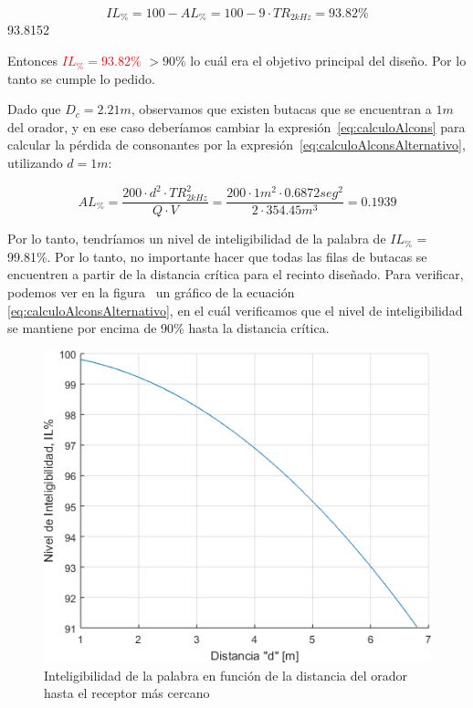 \begin{equation*}
   \boxed{ IL_{\%} = 100 - AL_{\%} = 100 - 9\cdot TR_{2kHz} =  93.82\% }
\end{equation*}
93.8152
\par Entonces \textcolor{red}{ $IL_{\%} =93.82\%$ } $> 90\% $ lo cuál era el objetivo principal del diseño. Por lo tanto se cumple lo pedido.\\

\par Dado que $D_c = 2.21m$, observamos que existen butacas que se encuentran a $1m$ del orador, y en ese caso deberíamos cambiar la expresión~\eqref{eq:calculoAlcons} para calcular la pérdida de consonantes por la expresión~\eqref{eq:calculoAlconsAlternativo}, utilizando $d=1m$:

\begin{equation*}
    \boxed{ AL_{\%} = \frac{200 \cdot d^2 \cdot TR_{2kHz}^2}{Q\cdot V} = \frac{200 \cdot 1m^2 \cdot 0.6872 seg^2}{2 \cdot 354.45m^3} = 0.1939 }
    \label{eq:calculoAlconsAlternativo}
\end{equation*}

\par Por lo tanto, tendríamos un nivel de inteligibilidad de la palabra de $IL_{\%}$ =  99.81\%. Por lo tanto, no importante hacer que todas las filas de butacas se encuentren a partir de la distancia crítica para el recinto diseñado. Para verificar, podemos ver en la figura~ un gráfico de la ecuación~ \eqref{eq:calculoAlconsAlternativo}, en el cuál verificamos que el nivel de inteligibilidad se mantiene por encima de 90\% hasta la distancia crítica.

\begin{figure}[H]
	\centering
	\includegraphics[width=1\textwidth]{./img/nivel_inteligibilidad.png}
	\caption{Inteligibilidad de la palabra en función de la distancia del orador hasta el receptor más cercano}
	\label{fig:nivel_inteligibilidad}
\end{figure}
